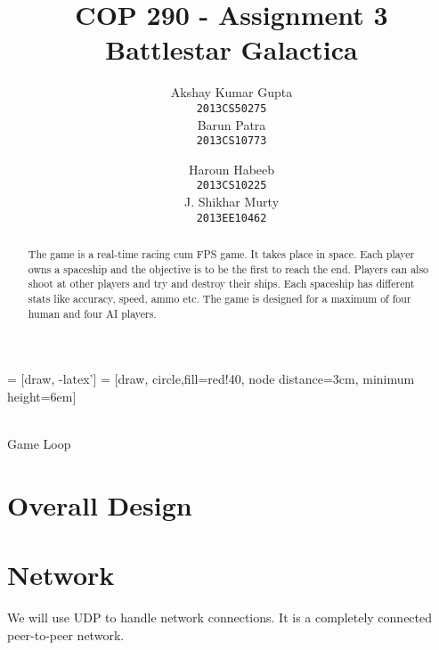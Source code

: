 \documentclass[]{article}
\newcommand{\ty}[1]{\texttt{#1}}
\begin{document}
\title{COP 290 - Assignment 3\\Battlestar Galactica}
\author{Akshay Kumar Gupta\\ \ty{2013CS50275} \\[.1in]  Barun Patra\\ \ty{2013CS10773} \and  Haroun Habeeb\\ \ty{2013CS10225} \\[.1in] J. Shikhar Murty\\ \ty{2013EE10462}}
\date{}
\maketitle
\begin{abstract}
\noindent The game is a real-time racing cum FPS game. It takes place in space. Each player owns a spaceship and the objective is to be the first to reach the end. Players can also shoot at other players and try and destroy their ships. Each spaceship has different stats like accuracy, speed, ammo etc. The game is designed for a maximum of four human and four AI players.
\end{abstract}
 = [draw, -latex']
 = [draw, circle,fill=red!40, node distance=3cm,
minimum height=6em]
\begin{center}
\\[0.3in]Game Loop
\end{center}
\section{Overall Design}
\section{Network}
We will use UDP to handle network connections. It is a completely connected peer-to-peer network.
\end{document}
